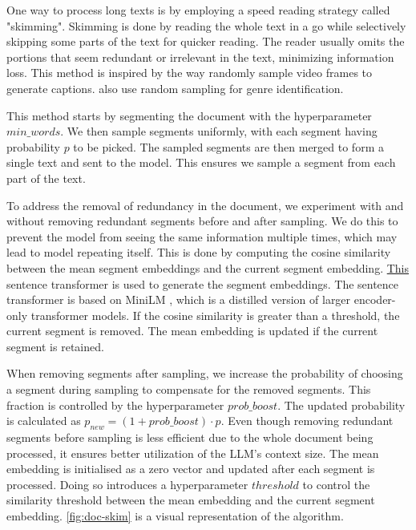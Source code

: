 		One way to process long texts is by employing a speed reading strategy called "skimming".
		Skimming is done by reading the whole text in a go while selectively skipping some parts of the
		text for quicker reading.
		The reader usually omits the portions that seem redundant or irrelevant in the text, minimizing
		information loss.
		This method is inspired by the way \citet{wang2024videoagent} randomly sample video frames to
		generate captions.
		\citet{worsham-kalita-2018-genre} also use random sampling for genre identification.

		This method starts by segmenting the document with the hyperparameter $min\_words$.
		We then sample segments uniformly, with each segment having probability $p$ to be picked.
		The sampled segments are then merged to form a single text and sent to the model.
		This ensures we sample a segment from each part of the text.

		To address the removal of redundancy in the document, we experiment with and without removing
		redundant segments before and after sampling.
		We do this to prevent the model from seeing the same information multiple times, which may
		lead to model repeating itself.
		This is done by computing the cosine similarity between the mean segment embeddings and the
		current segment embedding.
		\href{https://huggingface.co/sentence-transformers/all-MiniLM-L6-v2}{This} sentence transformer
		is used to generate the segment embeddings.
		The sentence transformer is based on MiniLM \cite{wang2020minilm}, which is a distilled version
		of larger encoder-only transformer models.
		If the cosine similarity is greater than a threshold, the current segment is removed.
		The mean embedding is updated if the current segment is retained.

		When removing segments after sampling, we increase the probability of choosing a segment during
		sampling to compensate for the removed segments.
		This fraction is controlled by the hyperparameter $prob\_boost$.
		The updated probability is calculated as $p_{new} = (1 + prob\_boost) \cdot p$.
		Even though removing redundant segments before sampling is less efficient due to the whole document
		being processed, it ensures better utilization of the LLM's context size.
		The mean embedding is initialised as a zero vector and updated after each segment is processed.
		Doing so introduces a hyperparameter $threshold$ to control the similarity threshold between the
		mean embedding and the current segment embedding.
		\autoref{fig:doc-skim} is a visual representation of the algorithm.


